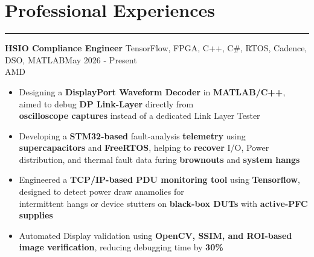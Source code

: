 \documentclass[10pt]{article}
\newcommand{\MHtLsep}{-0.7em}
\newcommand{\LtHsep}{0.9em}
\begin{document}

\newcommand{\WEVBsep}{0.0em}

\newcommand{\WStWSsep}{-1.15em}

\newcommand{\TtCsep}{0.15em}

\newcommand{\CtPsep}{-1.55em}

\newcommand{\PtPsep}{-1.7em}

\newcommand{\PTtPsep}{-1.7em}

\newcommand{\PStPSsep}{-1.15em}

\section*{\large {Professional Experiences}} \vspace{\MHtLsep} \hrule 
\vspace{\LtHsep}

\textbf{HSIO Compliance Engineer} \hspace{\WEVBsep}\textbar\hspace{\WEVBsep} TensorFlow, FPGA, C++, C\#, RTOS, Cadence, DSO, MATLAB\hfill May 2026 - Present \\[\TtCsep]
AMD \\[\CtPsep]
\begin{itemize}
    \item Designing a \textbf{DisplayPort Waveform Decoder} in \textbf{MATLAB/C++}, aimed to debug \textbf{DP Link-Layer} directly from \\ \textbf{oscilloscope captures} instead of a dedicated Link Layer Tester\\[\PtPsep]
    \item Developing a \textbf{STM32-based} fault-analysis \textbf{telemetry} using \textbf{supercapacitors} and \textbf{FreeRTOS}, helping to \textbf{recover} I/O, Power distribution, and thermal fault data furing \textbf{brownouts} and \textbf{system hangs}\\[\PtPsep]
    \item Engineered a \textbf{TCP/IP-based PDU monitoring tool} using \textbf{Tensorflow}, designed to detect power draw anamolies for \\ intermittent hangs or device stutters on \textbf{black-box DUTs} with \textbf{active-PFC supplies}\\[\PtPsep]
    \item Automated Display validation using \textbf{OpenCV, SSIM, and ROI-based image verification}, reducing debugging time by \textbf{30\%}\\[\WStWSsep]
    
\end{itemize} 
\end{document}
